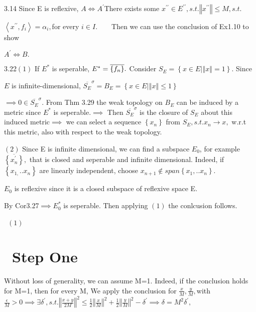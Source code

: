 \documentclass{article}
\begin{document}
3.14 Since E is reflexive, $A\iff A^{\prime }$There exists some $x^{\prime
\prime }\in E^{\prime \prime },s.t.\left\Vert x^{\prime \prime }\right\Vert
\leq M,s.t.$

$\left\langle x^{\prime \prime },f_{i}\right\rangle =\alpha _{i},$for every $%
i\in I.\qquad $Then we can use the conclusion of Ex1.10 to show

$A^{\prime }\iff B.$

3.22$\left( 1\right) $ If $E^{\ast }$ is seperable, $E^{\ast }=\overline{%
\left\{ f_{n}\right\} }.$ Consider $S_{E}=\left\{ x\in E|\left\Vert
x\right\Vert =1\right\} .$ Since

$E$ is infinite-dimensional, $\overline{S_{E}}^{\sigma }=B_{E}=\left\{ x\in
E|\left\Vert x\right\Vert \leq 1\right\} $

$\implies 0\in \overline{S_{E}}^{\sigma }.$ From Thm 3.29 the weak topology
on $B_{E}$ can be induced by a metric since $E^{\ast }$ is seperable.$%
\implies $ Then $\overline{S_{E}}^{\sigma }$ is the closure of $S_{E}$ about
this induced metric$\implies $ we can select a sequence $\left\{
x_{n}\right\} $ from $S_{E},s.t.x_{n}\rightarrow x,$ w.r.t this metric, also
with respect to the weak topology.

$\left( 2\right) $ Since E is infinite dimensional, we can find a subspace $%
E_{0}$, for example $\overline{\left\{ x_{n}^{\prime }\right\} },$ that is
closed and seperable and infinite dimensional. Indeed, if $\left\{
x_{1,}..x_{n}\right\} $ are linearly independent, choose $x_{n+1}\notin
span\left\{ x_{1},..x_{n}\right\} .$

$E_{0}$ is reflexive since it is a closed subspace of reflexive space E.

By Cor3.27$\implies E_{0}^{\ast }$ is seperable. Then applying $\left(
1\right) $ the conlcusion follows.

 \ $\left( 1\right) $

\section{ \ Step One}

Without loss of generality, we can assume M=1. Indeed, if the conclusion
holds for M=1, then for every M, We apply the conclusion for $\frac{x}{M},%
\frac{y}{M},$with $\frac{\epsilon }{M}>0\implies \exists \delta ^{\prime
},s.t.\left\Vert \frac{x+y}{2M}\right\Vert ^{2}\leq \frac{1}{2}\left\Vert 
\frac{x}{M}\right\Vert ^{2}+\frac{1}{2}\left\Vert \frac{y}{M}\right\Vert
^{2}-\delta ^{\prime }\implies \delta =M^{2}\delta ^{\prime },$
\end{document}
